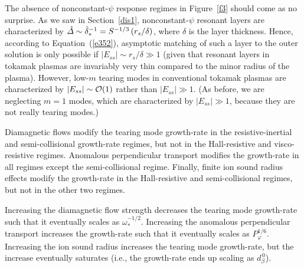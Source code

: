 \documentclass[notitlepage,12pt]{article}
\begin{document}
The absence of nonconstant-$\psi$ response regimes in Figure~\ref{f3}
should come as no surprise. As we saw in Section~\ref{dis1}, nonconstant-$\psi$ resonant layers
are characterized by $\hat{\mit\Delta}\sim\hat{\delta}_\ast^{-1}= S^{-1/3}\,(r_s/\delta)$, where $\delta$
is the layer thickness. Hence, according to Equation~(\ref{e352}), asymptotic matching of such a
layer to the outer solution is only possible if $|E_{ss}|\sim r_s/\delta \gg 1$ (given that resonant
layers in tokamak plasmas are invariably very thin compared to the minor radius of the plasma). However,
low-$m$ tearing modes in conventional tokamak plasmas are characterized by $|E_{ss}|\sim {\cal O}(1)$ rather than
$|E_{ss}|\gg 1$. (As before, we are neglecting $m=1$ modes, which are characterized by
$|E_{ss}|\gg 1$, because they are not really tearing modes.)

Diamagnetic flows modify the tearing mode growth-rate in the resistive-inertial and semi-collisional
growth-rate regimes, but not in the Hall-resistive and visco-resistive regimes. Anomalous perpendicular
transport modifies the growth-rate in all regimes except the semi-collisional regime. Finally, finite ion sound radius 
effects modify the growth-rate in the Hall-resistive and semi-collisional regimes, but not in the other two
regimes. 

Increasing  the diamagnetic flow strength decreases the tearing mode growth-rate such that it
eventually scales as $\omega_\ast^{-1/2}$. Increasing the anomalous perpendicular transport increases the
growth-rate such that it  eventually scales as $P_\varphi^{1/6}$. Increasing the ion sound radius 
increases the tearing mode growth-rate, but the increase eventually saturates (i.e., the
growth-rate ends up scaling as $d_\beta^{\,0}$). 
\end{document}
